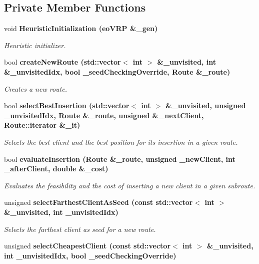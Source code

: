 \subsection*{Private Member Functions}
\begin{CompactItemize}
\item 
void \bf{Heuristic\-Initialization} (\bf{eo\-VRP} \&\_\-gen)
\begin{CompactList}\small\item\em Heuristic initializer. \item\end{CompactList}\item 
bool \bf{create\-New\-Route} (std::vector$<$ int $>$ \&\_\-unvisited, int \&\_\-unvisited\-Idx, bool \_\-seed\-Checking\-Override, Route \&\_\-route)
\begin{CompactList}\small\item\em Creates a new route. \item\end{CompactList}\item 
bool \bf{select\-Best\-Insertion} (std::vector$<$ int $>$ \&\_\-unvisited, unsigned \_\-unvisited\-Idx, Route \&\_\-route, unsigned \&\_\-next\-Client, Route::iterator \&\_\-it)
\begin{CompactList}\small\item\em Selects the best client and the best position for its insertion in a given route. \item\end{CompactList}\item 
bool \bf{evaluate\-Insertion} (Route \&\_\-route, unsigned \_\-new\-Client, int \_\-after\-Client, double \&\_\-cost)
\begin{CompactList}\small\item\em Evaluates the feasibility and the cost of inserting a new client in a given subroute. \item\end{CompactList}\item 
unsigned \bf{select\-Farthest\-Client\-As\-Seed} (const std::vector$<$ int $>$ \&\_\-unvisited, int \_\-unvisited\-Idx)
\begin{CompactList}\small\item\em Selects the farthest client as seed for a new route. \item\end{CompactList}\item 
unsigned \bf{select\-Cheapest\-Client} (const std::vector$<$ int $>$ \&\_\-unvisited, int \_\-unvisited\-Idx, bool \_\-seed\-Checking\-Override)

\end{CompactItemize}
